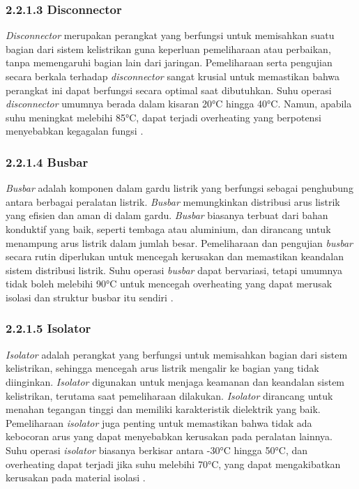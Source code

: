 \subsubsection{2.2.1.3 Disconnector}
\emph{Disconnector} merupakan perangkat yang berfungsi untuk memisahkan suatu bagian dari sistem kelistrikan guna keperluan pemeliharaan atau perbaikan, tanpa memengaruhi bagian lain dari jaringan. Pemeliharaan serta pengujian secara berkala terhadap \emph{disconnector} sangat krusial untuk memastikan bahwa perangkat ini dapat berfungsi secara optimal saat dibutuhkan. Suhu operasi \emph{disconnector} umumnya berada dalam kisaran 20°C hingga 40°C. Namun, apabila suhu meningkat melebihi 85°C, dapat terjadi overheating yang berpotensi menyebabkan kegagalan fungsi \cite{Henriana2022}.


\subsubsection{2.2.1.4 Busbar}
\emph{Busbar} adalah komponen dalam gardu listrik yang berfungsi sebagai penghubung antara berbagai peralatan listrik. \emph{Busbar} memungkinkan distribusi arus listrik yang efisien dan aman di dalam gardu. \emph{Busbar} biasanya terbuat dari bahan konduktif yang baik, seperti tembaga atau aluminium, dan dirancang untuk menampung arus listrik dalam jumlah besar. Pemeliharaan dan pengujian \emph{busbar} secara rutin diperlukan untuk mencegah kerusakan dan memastikan keandalan sistem distribusi listrik. Suhu operasi \emph{busbar} dapat bervariasi, tetapi umumnya tidak boleh melebihi 90°C untuk mencegah overheating yang dapat merusak isolasi dan struktur busbar itu sendiri \cite{Telaumbanua2024}.

\subsubsection{2.2.1.5 Isolator}
\emph{Isolator} adalah perangkat yang berfungsi untuk memisahkan bagian dari sistem kelistrikan, sehingga mencegah arus listrik mengalir ke bagian yang tidak diinginkan. \emph{Isolator} digunakan untuk menjaga keamanan dan keandalan sistem kelistrikan, terutama saat pemeliharaan dilakukan. \emph{Isolator} dirancang untuk menahan tegangan tinggi dan memiliki karakteristik dielektrik yang baik. Pemeliharaan \emph{isolator} juga penting untuk memastikan bahwa tidak ada kebocoran arus yang dapat menyebabkan kerusakan pada peralatan lainnya. Suhu operasi \emph{isolator} biasanya berkisar antara -30°C hingga 50°C, dan overheating dapat terjadi jika suhu melebihi 70°C, yang dapat mengakibatkan kerusakan pada material isolasi \cite{Moreno2017}.

